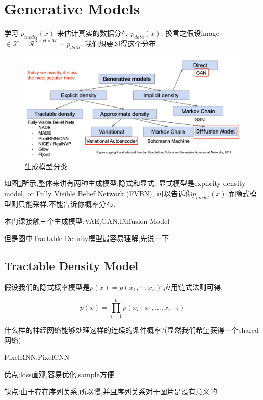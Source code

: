 \section{Generative Models}
	学习 $p_{model}(x)$ 来估计真实的数据分布 $p_{data}(x)$.
	换言之假设image$ \in \mathcal{X} = \mathcal{R}^{3\times H \times W}\sim p_{data}$.
	我们想要习得这个分布.

	\begin{figure}[htbp]
	\centering
	\includegraphics[scale=0.3]{figures/generative_model.png}
	\caption{生成模型分类}
	\label{fig:generative_model}
	\end{figure}

	如图\ref{fig:generative_model}所示,整体来讲有两种生成模型:隐式和显式.
	显式模型是expilcity density model, or Fully Visible Belief Network (FVBN), 
	可以告诉你$p_{model}(x)$;而隐式模型则只能采样,不能告诉你概率分布.
	
	本门课接触三个生成模型:VAE,GAN,Diffusion Model
	
	但是图中Tractable Density模型最容易理解,先说一下

	\subsection{Tractable Density Model}

	假设我们的隐式概率模型是$p(x) = p(x_1, \cdots, x_n)$,应用链式法则可得:
	
	\begin{equation}
		p(x)=\prod_{i=1}^{n} p\left(x_{i} \mid x_{1}, \ldots, x_{i-1}\right)
	\end{equation}
	
	什么样的神经网络能够处理这样的连续的条件概率?(显然我们希望获得一个shared网络)
	
	PixelRNN,PixelCNN
	
	优点:loss直观,容易优化,sample方便
	
	缺点:由于存在序列关系,所以慢,并且序列关系对于图片是没有意义的
	
